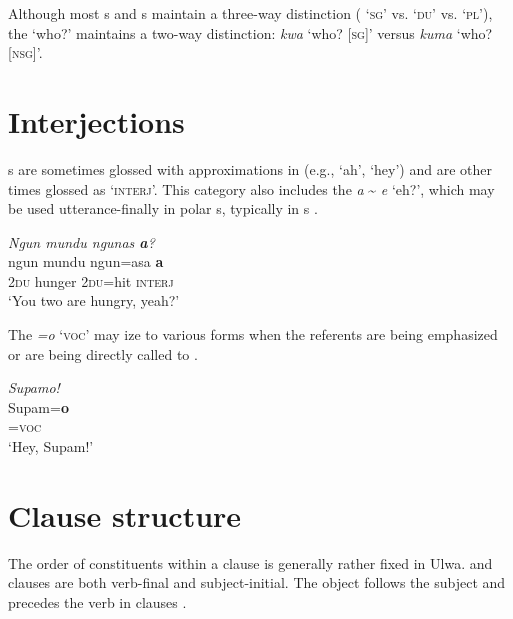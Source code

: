 Although most s and s maintain a three-way  distinction ( ‘\textsc{sg}’ vs.  ‘\textsc{du}’  vs.  ‘\textsc{pl}’), the  ‘who?’ maintains a two-way  distinction:  \textit{kwa} ‘who? [\textsc{sg}]’ versus  \textit{kuma} ‘who? [\textsc{nsg}]’.



\section{Interjections}\label{sec:overview:2.12}


s are sometimes glossed with approximations in  (e.g., ‘ah’, ‘hey’) and are other times glossed as ‘\textsc{interj}’. This category also includes the    \textit{a} {\textasciitilde} \textit{e} ‘eh?’, which may be used utterance-finally in  polar s, typically in s .

\ea%
    \label{ex:overview:54}
    \textit{Ngun mundu ngunas \textbf{a}?}\\
\gll    ngun  mundu    ngun=asa  \textbf{a}\\
    2\textsc{du}  hunger    2\textsc{du}=hit  \textsc{interj}\\
\glt    ‘You two are hungry, yeah?’
\z

The   \textit{=o} ‘\textsc{voc}’ may ize to various forms when the referents are being emphasized or are being directly called to .


\ea%
    \label{ex:overview:55}
    \textit{Supamo!}\\
\gll    Supam=\textbf{o}\\
    [name]=\textsc{voc}\\
\glt    ‘Hey, Supam!’
\z

\section{Clause structure}\label{sec:overview:2.13}

The  order of constituents within a clause is generally rather fixed in Ulwa.  and  clauses are both verb-final and subject-initial. The object follows the subject and precedes the verb in  clauses .

